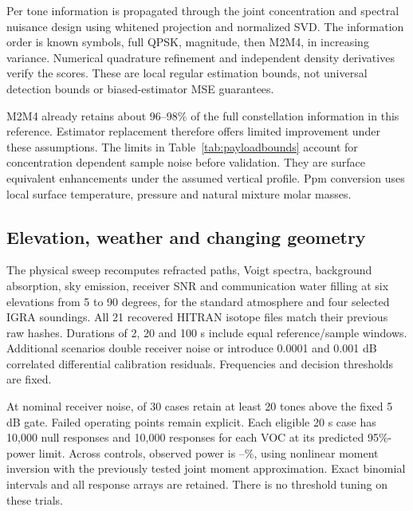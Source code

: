 Per tone information is propagated through the joint concentration and spectral nuisance design using whitened projection and normalized SVD. The information order is known symbols, full QPSK, magnitude, then M2M4, in increasing variance. Numerical quadrature refinement and independent density derivatives verify the scores. These are local regular estimation bounds, not universal detection bounds or biased-estimator MSE guarantees.

\begin{table}[t]\centering\footnotesize
\caption{Charged 10 s reference plus 10 s sample, standard atmosphere at 45 degrees, zero residual. Efficiency is joint full-QPSK CRLB variance divided by M2M4 variance.}

\label{tab:payloadbounds}
\end{table}
M2M4 already retains about 96--98\% of the full constellation information in this reference. Estimator replacement therefore offers limited improvement under these assumptions. The limits in Table~\ref{tab:payloadbounds} account for concentration dependent sample noise before validation. They are surface equivalent enhancements under the assumed vertical profile. Ppm conversion uses local surface temperature, pressure and natural mixture molar masses.

\subsection{Elevation, weather and changing geometry}
The physical sweep recomputes refracted paths, Voigt spectra, background absorption, sky emission, receiver SNR and communication water filling at six elevations from 5 to 90 degrees, for the standard atmosphere and four selected IGRA soundings. All 21 recovered HITRAN isotope files match their previous raw hashes. Durations of 2, 20 and 100 s include equal reference/sample windows. Additional scenarios double receiver noise or introduce 0.0001 and 0.001 dB correlated differential calibration residuals. Frequencies and decision thresholds are fixed.

At nominal receiver noise, \PayloadEligible{} of 30 cases retain at least 20 tones above the fixed 5 dB gate. Failed operating points remain explicit. Each eligible 20 s case has 10,000 null responses and 10,000 responses for each VOC at its predicted 95\%-power limit. Across \PayloadControls{} controls, observed power is \PayloadPowerMin--\PayloadPowerMax\%, using nonlinear moment inversion with the previously tested joint moment approximation. Exact binomial intervals and all response arrays are retained. There is no threshold tuning on these trials.

